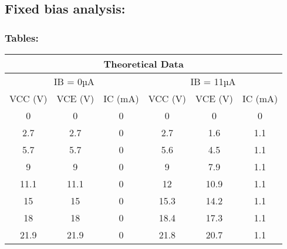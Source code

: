 \documentclass[a4paper, 12pt]{extarticle}
\begin{document}
\subsection{Fixed bias analysis:}
\subsubsection{Tables:}
\begin{table}[htbp]
  \centering
    \begin{tabular}{cccccc}
    \toprule
    \multicolumn{6}{|c|}{Theoretical Data} \\
    \midrule
    \multicolumn{3}{|c|}{IB = 0µA} & \multicolumn{3}{c|}{IB = 11µA} \\
    \midrule
    \multicolumn{1}{|c|}{VCC (V)} & \multicolumn{1}{c|}{VCE (V)} & \multicolumn{1}{c|}{IC (mA)} & \multicolumn{1}{c|}{VCC (V)} & \multicolumn{1}{c|}{VCE (V)} & \multicolumn{1}{c|}{IC (mA)} \\
    \midrule
    \multicolumn{1}{|c|}{0} & \multicolumn{1}{c|}{0} & \multicolumn{1}{c|}{0} & \multicolumn{1}{c|}{0} & \multicolumn{1}{c|}{0} & \multicolumn{1}{c|}{0} \\
    \midrule
    \multicolumn{1}{|c|}{2.7} & \multicolumn{1}{c|}{2.7} & \multicolumn{1}{c|}{0} & \multicolumn{1}{c|}{2.7} & \multicolumn{1}{c|}{1.6} & \multicolumn{1}{c|}{1.1} \\
    \midrule
    \multicolumn{1}{|c|}{5.7} & \multicolumn{1}{c|}{5.7} & \multicolumn{1}{c|}{0} & \multicolumn{1}{c|}{5.6} & \multicolumn{1}{c|}{4.5} & \multicolumn{1}{c|}{1.1} \\
    \midrule
    \multicolumn{1}{|c|}{9} & \multicolumn{1}{c|}{9} & \multicolumn{1}{c|}{0} & \multicolumn{1}{c|}{9} & \multicolumn{1}{c|}{7.9} & \multicolumn{1}{c|}{1.1} \\
    \midrule
    \multicolumn{1}{|c|}{11.1} & \multicolumn{1}{c|}{11.1} & \multicolumn{1}{c|}{0} & \multicolumn{1}{c|}{12} & \multicolumn{1}{c|}{10.9} & \multicolumn{1}{c|}{1.1} \\
    \midrule
    \multicolumn{1}{|c|}{15} & \multicolumn{1}{c|}{15} & \multicolumn{1}{c|}{0} & \multicolumn{1}{c|}{15.3} & \multicolumn{1}{c|}{14.2} & \multicolumn{1}{c|}{1.1} \\
    \midrule
    \multicolumn{1}{|c|}{18} & \multicolumn{1}{c|}{18} & \multicolumn{1}{c|}{0} & \multicolumn{1}{c|}{18.4} & \multicolumn{1}{c|}{17.3} & \multicolumn{1}{c|}{1.1} \\
    \midrule
    \multicolumn{1}{|c|}{21.9} & \multicolumn{1}{c|}{21.9} & \multicolumn{1}{c|}{0} & \multicolumn{1}{c|}{21.8} & \multicolumn{1}{c|}{20.7} & \multicolumn{1}{c|}{1.1} \\

\end{tabular}
\end{table}
\end{document}
